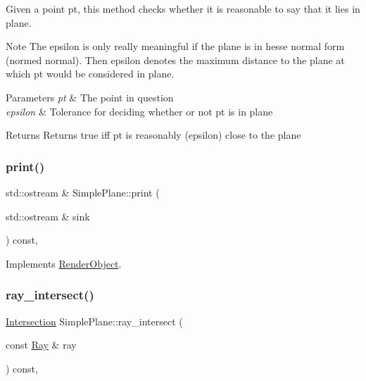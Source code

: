 Given a point pt, this method checks whether it is reasonable to say that it lies in plane. 

\begin{DoxyNote}{Note}
The epsilon is only really meaningful if the plane is in hesse normal form (normed normal). Then epsilon denotes the maximum distance to the plane at which pt would be considered in plane. 
\end{DoxyNote}

\begin{DoxyParams}{Parameters}
{\em pt} & The point in question \\
\hline
{\em epsilon} & Tolerance for deciding whether or not pt is in plane \\
\hline
\end{DoxyParams}
\begin{DoxyReturn}{Returns}
Returns true iff pt is reasonably (epsilon) close to the plane 
\end{DoxyReturn}
\mbox{\label{classSimplePlane_afc8014126bb264e11e7b2b470a8a90a1}} 
\subsubsection{\texorpdfstring{print()}{print()}}
{\footnotesize\ttfamily std\+::ostream \& Simple\+Plane\+::print (\begin{DoxyParamCaption}\item[{std\+::ostream \&}]{sink }\end{DoxyParamCaption}) const\hspace{0.3cm}{\ttfamily [override]}, {\ttfamily [virtual]}}



Implements \mbox{\hyperlink{classRenderObject_a7a7f1168a7d96ca95235b170ff7fb11b}{Render\+Object}}.

\mbox{\label{classSimplePlane_adffd7f102bed30d44cd527cb34a3a312}} 
\subsubsection{\texorpdfstring{ray\_intersect()}{ray\_intersect()}}
{\footnotesize\ttfamily \mbox{\hyperlink{classIntersection}{Intersection}} Simple\+Plane\+::ray\+\_\+intersect (\begin{DoxyParamCaption}\item[{const \mbox{\hyperlink{classRay}{Ray}} \&}]{ray }\end{DoxyParamCaption}) const\hspace{0.3cm}{\ttfamily [override]}, {\ttfamily [virtual]}}



